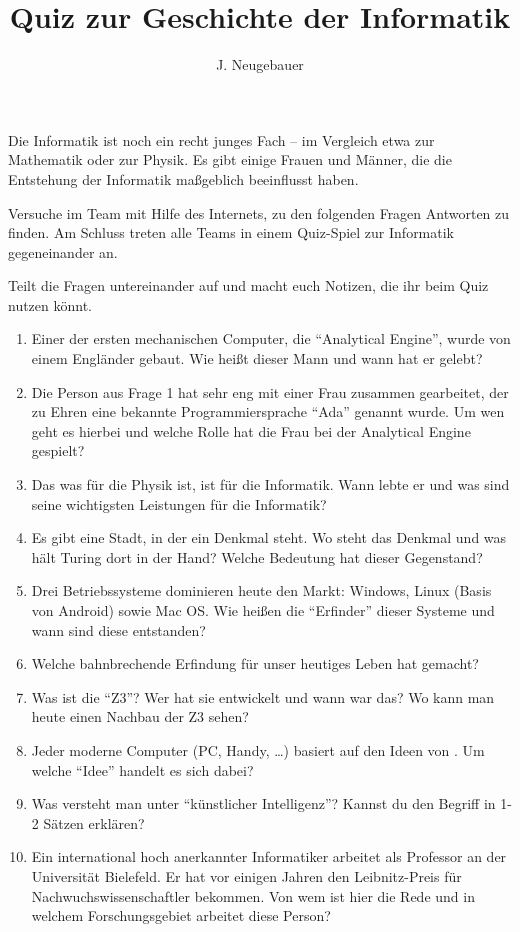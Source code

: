 \documentclass[10pt, a4paper]{scrartcl}
\author{J. Neugebauer}
\title{Quiz zur Geschichte der Informatik}
\date{\Heute}
\begin{document}
\ReiheTitel

Die Informatik ist noch ein recht junges Fach – im Vergleich etwa zur Mathematik oder zur Physik. 
Es gibt einige Frauen und Männer, die die Entstehung der Informatik maßgeblich beeinflusst haben.


Versuche im Team mit Hilfe des Internets, zu den folgenden Fragen Antworten zu finden. Am Schluss treten
alle Teams in einem Quiz-Spiel zur Informatik gegeneinander an.


Teilt die Fragen untereinander auf und macht euch Notizen, die ihr beim Quiz nutzen könnt.

\begin{enumerate}
	\item Einer der ersten mechanischen Computer, die \enquote{Analytical Engine}, wurde von einem Engländer gebaut. Wie heißt dieser Mann und wann hat er gelebt?
	\item Die Person aus Frage 1 hat sehr eng mit einer Frau zusammen gearbeitet, der zu Ehren eine bekannte Programmiersprache \enquote{Ada} genannt wurde. Um wen geht es hierbei und welche Rolle hat die Frau bei der Analytical Engine gespielt?
	\item Das was  für die Physik ist, ist  für die Informatik. 
	Wann lebte er und was sind seine wichtigsten Leistungen für die Informatik?
	\item Es gibt eine Stadt, in der ein Denkmal  steht. Wo steht das Denkmal und was hält Turing dort in der Hand? Welche Bedeutung hat dieser Gegenstand?
	\item Drei Betriebssysteme dominieren heute den Markt: Windows, Linux (Basis von Android) sowie Mac OS. Wie heißen die \enquote{Erfinder} dieser Systeme und wann sind diese entstanden? 
	\item Welche bahnbrechende Erfindung für unser heutiges Leben hat  gemacht?
	\item Was ist die \enquote{Z3}? Wer hat sie entwickelt und wann war das? Wo kann man heute einen Nachbau der Z3 sehen?
	\item Jeder moderne Computer (PC, Handy, …) basiert auf den Ideen von . Um welche \enquote{Idee} handelt es sich dabei?
	\item Was versteht man unter \enquote{künstlicher Intelligenz}? Kannst du den Begriff in 1-2 Sätzen erklären?
	\item Ein international hoch anerkannter Informatiker arbeitet als Professor an der Universität Bielefeld. Er hat vor einigen Jahren den Leibnitz-Preis für Nachwuchswissenschaftler bekommen. Von wem ist hier die Rede und in welchem Forschungsgebiet arbeitet diese Person?

\end{enumerate}
\end{document}
